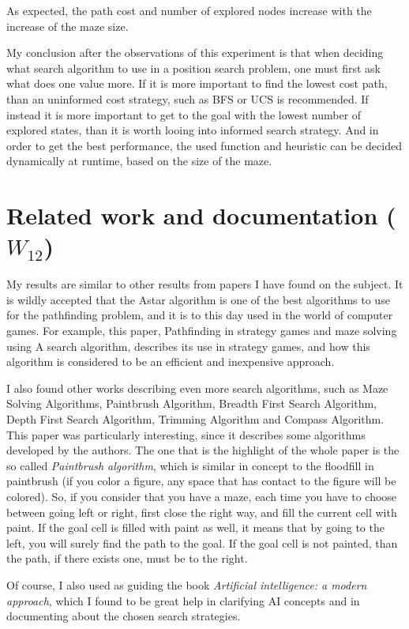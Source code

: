 \documentclass[a4paper,12pt]{report}
\begin{document}
As expected, the path cost and number of explored nodes increase with the increase of the maze size.

My conclusion after the observations of this experiment is that when deciding what search algorithm to use in a position search problem, one must first ask what does one value more. If it is more important to find the lowest cost path, than an uninformed cost strategy, such as BFS or UCS is recommended. If instead it is more important to get to the goal with the lowest number of explored states, than it is worth looing into informed search strategy. And in order to get the best performance, the used function and heuristic can be decided dynamically at runtime, based on the size of the maze.

\chapter{Related work and documentation ($W_{12}$)}

My results are similar to other results from papers I have found on the subject. It is wildly accepted that the Astar algorithm is one of the best algorithms to use for the pathfinding problem, and it is to this day used in the world of computer games. For example, this paper\cite{wiki05}, Pathfinding in strategy games and maze solving using A search algorithm, describes its use in strategy games, and how this algorithm is considered to be an efficient and inexpensive approach.

I also found other works describing even more search algorithms, such as Maze Solving Algorithms, Paintbrush Algorithm, Breadth First Search Algorithm, Depth First Search Algorithm, Trimming Algorithm and Compass Algorithm\cite{wiki06}. This paper was particularly interesting, since it describes some algorithms developed by the authors. The one that is the highlight of the whole paper is the so called \textit{Paintbrush algorithm}, which is similar in concept to the floodfill in paintbrush (if you color a figure, any space that has contact to the figure will be colored). So, if you consider that you have a maze, each time you have to choose between going left or right, first close the right way, and fill the current cell with paint. If the goal cell is filled with paint as well, it means that by going to the left, you will surely find the path to the goal. If the goal cell is not painted, than the path, if there exists one, must be to the right.

Of course, I also used as guiding the book \textit{Artificial intelligence: a modern approach}\cite{russell2016artificial}, which I found to be great help in clarifying AI concepts and in documenting about the chosen search strategies.
\end{document}
